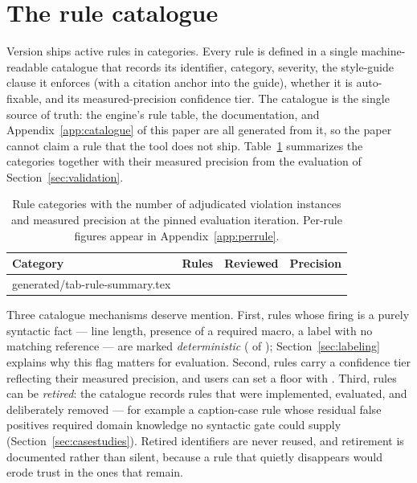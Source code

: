 \documentclass[nojss,article]{jss}
\makeatletter
\newcommand{\rawinput}[1]{\@@input #1 }
\makeatother
\begin{document}
\clearpage
\section{The rule catalogue}
\label{sec:rules}

Version \StatToolVersion{} ships \StatRuleCount{} active rules in
\StatCategoryCount{} categories. Every rule is defined in a single
machine-readable catalogue that records its identifier, category,
severity, the style-guide clause it enforces (with a citation anchor
into the guide), whether it is auto-fixable, and its measured-precision
confidence tier. The catalogue is the single source of truth: the
engine's rule table, the  documentation, and
Appendix~\ref{app:catalogue} of this paper are all generated from it,
so the paper cannot claim a rule that the tool does not ship.
Table~\ref{tab:rulesummary} summarizes the categories together with
their measured precision from the evaluation of
Section~\ref{sec:validation}.

\begin{table}[t!]
\centering
\begin{tabular}{lrrr}
\toprule
Category & Rules & Reviewed & Precision \\
\midrule
\rawinput{generated/tab-rule-summary.tex}
\end{tabular}
\caption{Rule categories with the number of adjudicated violation
  instances and measured precision at the pinned evaluation
  iteration. Per-rule figures appear in Appendix~\ref{app:perrule}.}
\label{tab:rulesummary}
\end{table}

Three catalogue mechanisms deserve mention. First, rules whose firing
is a purely syntactic fact --- line length, presence of a required
macro, a label with no matching reference --- are marked
\emph{deterministic} (\StatDeterministicCount{} of \StatRuleCount{});
Section~\ref{sec:labeling} explains why this flag matters for
evaluation. Second, rules carry a confidence tier reflecting their
measured precision, and users can set a floor with
. Third, rules can be \emph{retired}: the
catalogue records \StatRetiredCount{} rules that were implemented,
evaluated, and deliberately removed --- for example a caption-case
rule whose residual false positives required domain knowledge no
syntactic gate could supply (Section~\ref{sec:casestudies}). Retired
identifiers are never reused, and retirement is documented rather
than silent, because a rule that quietly disappears would erode trust
in the ones that remain.
\end{document}
